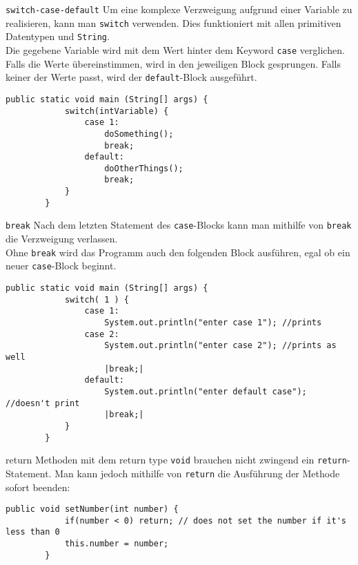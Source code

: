 \begin{frame}[fragile]{\texttt{switch-case-default}}
	Um eine komplexe Verzweigung aufgrund einer Variable zu realisieren, kann man \texttt{switch} verwenden.
    Dies funktioniert mit allen primitiven Datentypen und \texttt{String}. \\
	\vfill
    Die gegebene Variable wird mit dem Wert hinter dem Keyword \texttt{case} verglichen.
    Falls die Werte übereinstimmen, wird in den jeweiligen Block gesprungen.
    Falls keiner der Werte passt, wird der \texttt{default}-Block ausgeführt.
	\begin{lstlisting}[gobble=8]
        public static void main (String[] args) {
            switch(intVariable) {
                case 1:
                    doSomething();
                    break;
                default:
                    doOtherThings();
                    break;
            }
        }
	\end{lstlisting}
    \end{frame}
\begin{frame}[fragile]{\texttt{break}}
    Nach dem letzten Statement des \texttt{case}-Blocks kann man mithilfe von \texttt{break} die Verzweigung verlassen.\\
    Ohne \texttt{break} wird das Programm auch den folgenden Block ausführen, egal ob ein neuer \texttt{case}-Block beginnt.
	\begin{lstlisting}[gobble=8]
        public static void main (String[] args) {
            switch( 1 ) {
                case 1:
                    System.out.println("enter case 1"); //prints
                case 2:
                    System.out.println("enter case 2"); //prints as well
                    |break;|
                default:
                    System.out.println("enter default case"); //doesn't print
                    |break;|
            }
        }
	\end{lstlisting}
\end{frame}

\begin{frame}[fragile]{return}
    Methoden mit dem return type \texttt{void} brauchen nicht zwingend ein \texttt{return}-Statement.
    Man kann jedoch mithilfe von \texttt{return} die Ausführung der Methode sofort beenden:
	\begin{lstlisting}[gobble=8]
        public void setNumber(int number) {
            if(number < 0) return; // does not set the number if it's less than 0
            this.number = number;
        }
	\end{lstlisting}
\end{frame}

